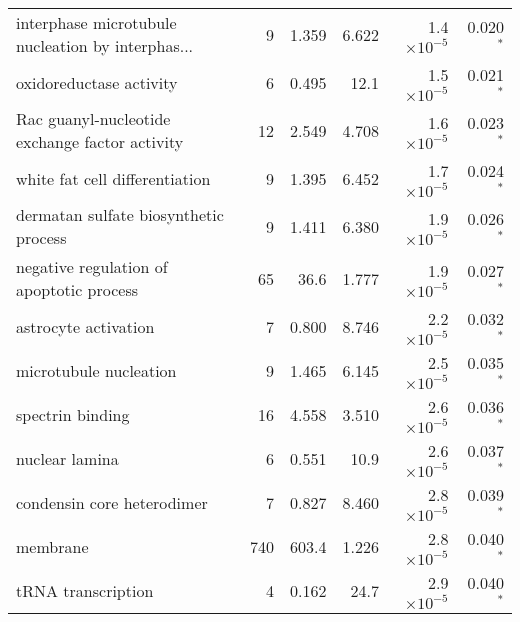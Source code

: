 \begin{longtable}{|l|r|r|r|r|r|}
 interphase microtubule nucleation by interphas... &                       9 &                   1.359 &      6.622 &  1.4$\times 10^{-5}$ &                 0.020$\bm{^*}$ \\
                           oxidoreductase activity &                       6 &                   0.495 &       12.1 &  1.5$\times 10^{-5}$ &                 0.021$\bm{^*}$ \\
    Rac guanyl-nucleotide exchange factor activity &                      12 &                   2.549 &      4.708 &  1.6$\times 10^{-5}$ &                 0.023$\bm{^*}$ \\
                    white fat cell differentiation &                       9 &                   1.395 &      6.452 &  1.7$\times 10^{-5}$ &                 0.024$\bm{^*}$ \\
             dermatan sulfate biosynthetic process &                       9 &                   1.411 &      6.380 &  1.9$\times 10^{-5}$ &                 0.026$\bm{^*}$ \\
          negative regulation of apoptotic process &                      65 &                    36.6 &      1.777 &  1.9$\times 10^{-5}$ &                 0.027$\bm{^*}$ \\
                              astrocyte activation &                       7 &                   0.800 &      8.746 &  2.2$\times 10^{-5}$ &                 0.032$\bm{^*}$ \\
                            microtubule nucleation &                       9 &                   1.465 &      6.145 &  2.5$\times 10^{-5}$ &                 0.035$\bm{^*}$ \\
                                  spectrin binding &                      16 &                   4.558 &      3.510 &  2.6$\times 10^{-5}$ &                 0.036$\bm{^*}$ \\
                                    nuclear lamina &                       6 &                   0.551 &       10.9 &  2.6$\times 10^{-5}$ &                 0.037$\bm{^*}$ \\
                        condensin core heterodimer &                       7 &                   0.827 &      8.460 &  2.8$\times 10^{-5}$ &                 0.039$\bm{^*}$ \\
                                          membrane &                     740 &                   603.4 &      1.226 &  2.8$\times 10^{-5}$ &                 0.040$\bm{^*}$ \\
                                tRNA transcription &                       4 &                   0.162 &       24.7 &  2.9$\times 10^{-5}$ &                 0.040$\bm{^*}$ \\

\end{longtable}
